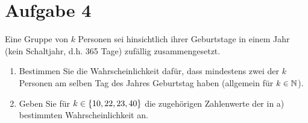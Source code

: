 \documentclass{exercise}
\begin{document}
    \section*{Aufgabe 4}

    \begin{problem}
        Eine Gruppe von \(k\) Personen sei hinsichtlich ihrer Geburtstage in einem Jahr (kein Schaltjahr, d.h. 365 Tage) zufällig zusammengesetzt.
        \begin{enumerate}
            \item Bestimmen Sie die Wahrscheinlichkeit dafür, dass mindestens zwei der \(k\) Personen am selben Tag des Jahres Geburtstag haben (allgemein für \(k \in \N\)).
            \item Geben Sie für \(k \in \braces*{10, 22, 23, 40}\) die zugehörigen Zahlenwerte der in a) bestimmten Wahrscheinlichkeit an.
        \end{enumerate}
    \end{problem}
\end{document}
